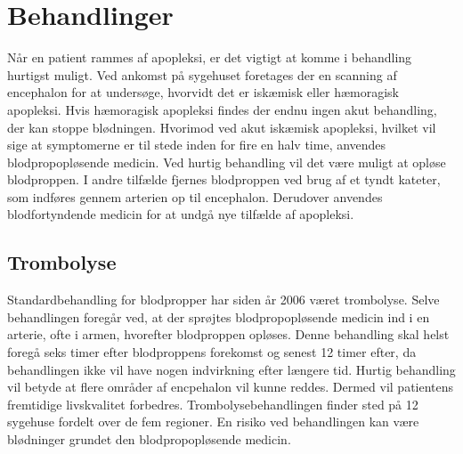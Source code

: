 \section{Behandlinger}
Når en patient rammes af apopleksi, er det vigtigt at komme i behandling hurtigst muligt. Ved ankomst på sygehuset foretages der en scanning af encephalon for at undersøge, hvorvidt det er iskæmisk eller hæmoragisk apopleksi. Hvis hæmoragisk apopleksi findes der endnu ingen akut behandling, der kan stoppe blødningen.\cite{Soenderborg2013} Hvorimod ved akut iskæmisk apopleksi, hvilket vil sige at symptomerne er til stede inden for fire en halv time, anvendes blodpropopløsende medicin. Ved hurtig behandling vil det være muligt at opløse blodproppen. I andre tilfælde fjernes blodproppen ved brug af et tyndt kateter, som indføres gennem arterien op til encephalon. Derudover anvendes blodfortyndende medicin for at undgå nye tilfælde af apopleksi. \cite{Hjerteforeningen2014, Kruuse2014a} 

%
\subsection{Trombolyse}
Standardbehandling for blodpropper har siden år 2006 været trombolyse. Selve behandlingen foregår ved, at der sprøjtes blodpropopløsende medicin ind i en arterie, ofte i armen, hvorefter blodproppen opløses. Denne behandling skal helst foregå seks timer efter blodproppens forekomst og senest 12 timer efter, da behandlingen ikke vil have nogen indvirkning efter længere tid. Hurtig behandling vil betyde at flere områder af encpehalon vil kunne reddes. Dermed vil patientens fremtidige livskvalitet forbedres. Trombolysebehandlingen finder sted på 12 sygehuse fordelt over de fem regioner. En risiko ved behandlingen kan være blødninger grundet den blodpropopløsende medicin. \cite{Hjernesagen2015b}

